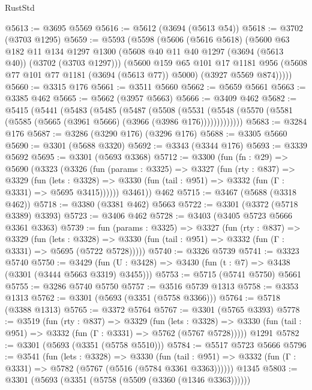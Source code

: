 \begin{lexlean}{RustStd}
\begin{coremodule}
@5613 := @3695 @5569
@5616 := @5612 (@3694 (@5613 @54))
@5618 := @3702 (@3703 @1295)
@5659 := @5593
    (@5598
      (@5606
        (@5616 @5618)
        (@5600
          @63
          @182
          @11
          @134
          @1297
          @1300
          (@5608 @40 @11 @40 @1297 (@3694 (@5613 @40)) (@3702 (@3703 @1297)))
          (@5600
            @159
            @65
            @101
            @17
            @1181
            @956
            (@5608 @77 @101 @77 @1181 (@3694 (@5613 @77)) @5000)
            (@3927 @5569 @874)))))
@5660 := @3315 @176
@5661 := @3511 @5660
@5662 := @5659 @5661
@5663 := @3385 @462
@5665 := @5662 (@3957 @5663)
@5666 := @3409 @462
@5682 := @5415
    (@5441
      (@5483
        (@5485
          (@5487
            (@5508
              (@5531
                (@5548 (@5570 (@5581 (@5585 (@5665 (@3961 @5666) (@3966 (@3986 @176)))))))))))))
@5683 := @3284 @176
@5687 := @3286 (@3290 @176) (@3296 @176)
@5688 := @3305 @5660
@5690 := @3301 (@5688 @3320)
@5692 := @3343 (@3344 @176)
@5693 := @3339 @5692
@5695 := @3301 (@5693 @3368)
@5712 := @3300
    (fun (fn : @29) =>
    @5690
      (@3323
        (@3326
          (fun (params : @3325) =>
          @3327
            (fun (rty : @837) =>
            @3329
              (fun (lets : @3328) =>
              @3330 (fun (tail : @951) => @3332 (fun (Γ : @3331) => @5695 @3415))))))
        @3461))
    @462
@5715 := @3467 (@5688 (@3318 @462))
@5718 := @3380 (@3381 @462) @5663
@5722 := @3301 (@3372 (@5718 @3389) @3393)
@5723 := @3406 @462
@5728 := @3403 (@3405 @5723 @5666 @3361 @3363)
@5739 := fun (params : @3325) =>
  @3327
    (fun (rty : @837) =>
    @3329
      (fun (lets : @3328) =>
      @3330 (fun (tail : @951) => @3332 (fun (Γ : @3331) => @5695 (@5722 @5728)))))
@5740 := @3326 @5739
@5741 := @3323 @5740
@5750 := @3429 (fun (U : @3428) => @3430 (fun (t : @7) => @3438 (@3301 (@3444 @5663 @3319) @3455)))
@5753 := @5715 (@5741 @5750) @5661
@5755 := @3286 @5740 @5750
@5757 := @3516 @5739 @1313
@5758 := @3353 @1313
@5762 := @3301 (@5693 (@3351 (@5758 @3366)))
@5764 := @5718 (@3388 @1313)
@5765 := @3372 @5764
@5767 := @3301 (@5765 @3393)
@5778 := @3519
    (fun (rty : @837) =>
    @3329
      (fun (lets : @3328) =>
      @3330 (fun (tail : @951) => @3332 (fun (Γ : @3331) => @5762 (@5767 @5728)))))
    @1291
@5782 := @3301 (@5693 (@3351 (@5758 @5510)))
@5784 := @5517 @5723 @5666
@5796 := @3541
    (fun (lets : @3328) =>
    @3330
      (fun (tail : @951) => @3332 (fun (Γ : @3331) => @5782 (@5767 (@5516 (@5784 @3361 @3363))))))
    @1345
@5803 := @3301 (@5693 (@3351 (@5758 (@5509 (@3360 (@1346 @3363))))))

\end{coremodule}
\end{lexlean}
